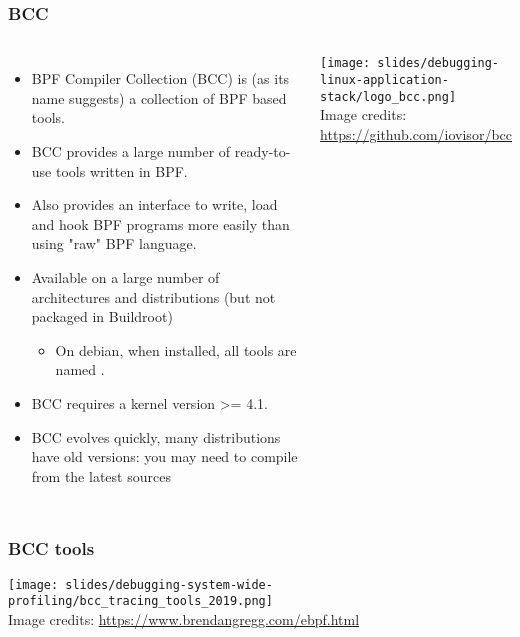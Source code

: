 \begin{frame}[fragile]
  \frametitle{BCC}
  \begin{columns}
    \begin{itemize}
      \item BPF Compiler Collection (BCC) is (as its name suggests) a collection
            of BPF based tools.
      \item BCC provides a large number of ready-to-use tools written in BPF.
      \item Also provides an interface to write, load and hook BPF programs more
            easily than using "raw" BPF language.
      \item Available on a large number of architectures and distributions
	      (but not packaged in Buildroot)
      \begin{itemize}
        \item On debian, when installed, all tools are named .
      \end{itemize}
      \item BCC requires a kernel version >= 4.1.
      \item BCC evolves quickly, many distributions have old versions: you
            may need to compile from the latest sources
    \end{itemize}
  \vspace{0.5cm}
  \texttt{[image: slides/debugging-linux-application-stack/logo\_bcc.png]}\\
  \tiny Image credits: \url{https://github.com/iovisor/bcc}
  \end{columns}
\end{frame}

\begin{frame}[fragile]
  \frametitle{BCC tools}
  \begin{center}
    \texttt{[image: slides/debugging-system-wide-profiling/bcc\_tracing\_tools\_2019.png]}\\
    \tiny Image credits: \url{https://www.brendangregg.com/ebpf.html}
  \end{center}
\end{frame}


